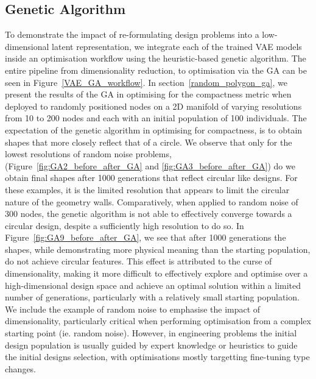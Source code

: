 \documentclass{article}
\begin{document}
\subsection{Genetic Algorithm}
To demonstrate the impact of re-formulating design problems into a low-dimensional latent representation, we integrate each of the trained VAE models inside an optimisation workflow using the heuristic-based genetic algorithm. The entire pipeline from dimensionality reduction, to optimisation via the GA can be seen in Figure~\ref{VAE_GA_workflow}. In section~\ref{random_polygon_ga}, we present the results of the GA in optimising for the compactness metric when deployed to randomly positioned nodes on a 2D manifold of varying resolutions from 10 to 200 nodes and each with an initial population of 100 individuals. The expectation of the genetic algorithm in optimising for compactness, is to obtain shapes that more closely reflect that of a circle. We observe that only for the lowest resolutions of random noise problems, (Figure~\ref{fig:GA2_before_after_GA} and \ref{fig:GA3_before_after_GA}) do we obtain final shapes after 1000 generations that reflect circular like designs. For these examples, it is the limited resolution that appears to limit the circular nature of the geometry walls. Comparatively, when applied to random noise of 300 nodes, the genetic algorithm is not able to effectively converge towards a circular design, despite a sufficiently high resolution to do so. In Figure~\ref{fig:GA9_before_after_GA}, we see that after 1000 generations the shapes, while demonstrating more physical meaning than the starting population, do not achieve circular features. This effect is attributed to the curse of dimensionality, making it more difficult to effectively explore and optimise over a high-dimensional design space and achieve an optimal solution within a limited number of generations, particularly with a relatively small starting population. We include the example of random noise to emphasise the impact of dimensionality, particularly critical when performing optimisation from a complex starting point (ie. random noise). However, in engineering problems the initial design population is usually guided by expert knowledge or heuristics to guide the initial designs selection, with optimisations mostly targetting fine-tuning type changes.
\end{document}
